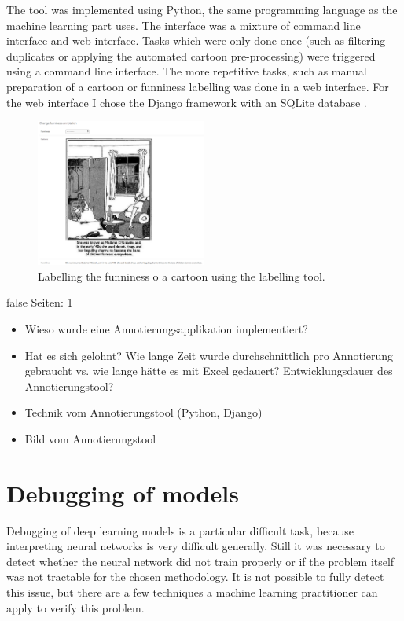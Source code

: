 \documentclass[draft,final,oneside]{vutinfth} %
\begin{document}
The tool was implemented using Python, the same programming language as the machine learning part uses. The interface was a mixture of command line interface and web interface. Tasks which were only done once (such as filtering duplicates or applying the automated cartoon pre-processing) were triggered using a command line interface. The more repetitive tasks, such as manual preparation of a cartoon or funniness labelling was done in a web interface. For the web interface I chose the Django framework with an SQLite database \cite{django}\cite{sqlite}. 

\begin{figure}
	\centering
  	\includegraphics[width=0.5\textwidth]{graphics/labeling_tool.png}
	\caption{Labelling the funniness o a cartoon using the labelling tool.}
	\label{fig:labellingtool}
\end{figure}

\if false
Seiten: 1

\begin{itemize}
\item Wieso wurde eine Annotierungsapplikation implementiert?
\item Hat es sich gelohnt? Wie lange Zeit wurde durchschnittlich pro Annotierung gebraucht vs. wie lange hätte es mit Excel gedauert? Entwicklungsdauer des Annotierungstool?
\item Technik vom Annotierungstool (Python, Django)
\item Bild vom Annotierungstool
\end{itemize}
\fi


\section{Debugging of models}

Debugging of deep learning models is a particular difficult task, because interpreting neural networks is very difficult generally. Still it was necessary to detect whether the neural network did not train properly or if the problem itself was not tractable for the chosen methodology. It is not possible to fully detect this issue, but there are a few techniques a machine learning practitioner can apply to verify this problem.
\end{document}
